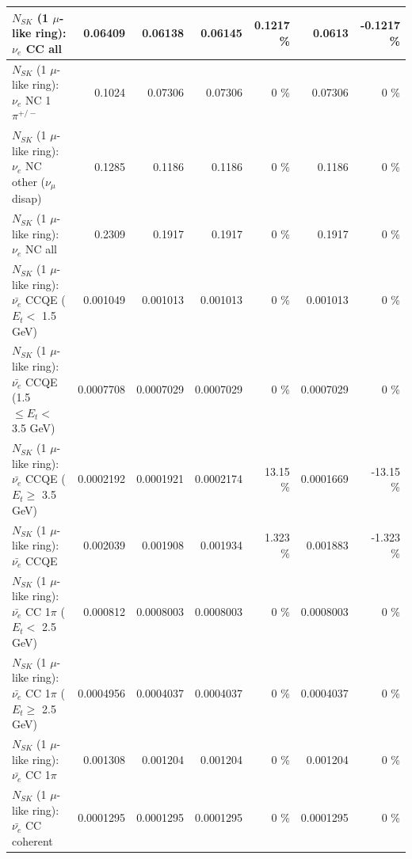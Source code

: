 \begin{table}
\begin{tabular}{| l | r | r | r  r | r  r |}
                                  $N_{SK}$ (1 $\mu$-like ring): $\nu_{e}$ CC all &         0.06409 &         0.06138 &         0.06145 &   0.1217 \%  &          0.0613 &  -0.1217 \%  \\ 
\hline
                           $N_{SK}$ (1 $\mu$-like ring): $\nu_e$ NC 1$\pi^{+/-}$ &          0.1024 &         0.07306 &         0.07306 &        0 \%  &         0.07306 &        0 \%  \\ 
                $N_{SK}$ (1 $\mu$-like ring): $\nu_e$ NC other ($\nu_\mu$ disap) &          0.1285 &          0.1186 &          0.1186 &        0 \%  &          0.1186 &        0 \%  \\ 
                                  $N_{SK}$ (1 $\mu$-like ring): $\nu_{e}$ NC all &          0.2309 &          0.1917 &          0.1917 &        0 \%  &          0.1917 &        0 \%  \\ 
\hline
\hline
\hline
            $N_{SK}$ (1 $\mu$-like ring): $\bar{\nu_e}$ CCQE ($E_{t} <$ 1.5 GeV) &        0.001049 &        0.001013 &        0.001013 &        0 \%  &        0.001013 &        0 \%  \\ 
   $N_{SK}$ (1 $\mu$-like ring): $\bar{\nu_e}$ CCQE (1.5 $\leq E_{t} <$ 3.5 GeV) &       0.0007708 &       0.0007029 &       0.0007029 &        0 \%  &       0.0007029 &        0 \%  \\ 
         $N_{SK}$ (1 $\mu$-like ring): $\bar{\nu_e}$ CCQE ($E_{t} \geq$ 3.5 GeV) &       0.0002192 &       0.0001921 &       0.0002174 &    13.15 \%  &       0.0001669 &   -13.15 \%  \\ 
\hline
                                $N_{SK}$ (1 $\mu$-like ring): $\bar{\nu_e}$ CCQE &        0.002039 &        0.001908 &        0.001934 &    1.323 \%  &        0.001883 &   -1.323 \%  \\ 
\hline
       $N_{SK}$ (1 $\mu$-like ring): $\bar{\nu_e}$ CC 1$\pi$ ($E_{t} <$ 2.5 GeV) &        0.000812 &       0.0008003 &       0.0008003 &        0 \%  &       0.0008003 &        0 \%  \\ 
    $N_{SK}$ (1 $\mu$-like ring): $\bar{\nu_e}$ CC 1$\pi$ ($E_{t} \geq$ 2.5 GeV) &       0.0004956 &       0.0004037 &       0.0004037 &        0 \%  &       0.0004037 &        0 \%  \\ 
\hline
                           $N_{SK}$ (1 $\mu$-like ring): $\bar{\nu_e}$ CC 1$\pi$ &        0.001308 &        0.001204 &        0.001204 &        0 \%  &        0.001204 &        0 \%  \\ 
                         $N_{SK}$ (1 $\mu$-like ring): $\bar{\nu_e}$ CC coherent &       0.0001295 &       0.0001295 &       0.0001295 &        0 \%  &       0.0001295 &        0 \%  \\ 

\end{tabular}
\end{table}
